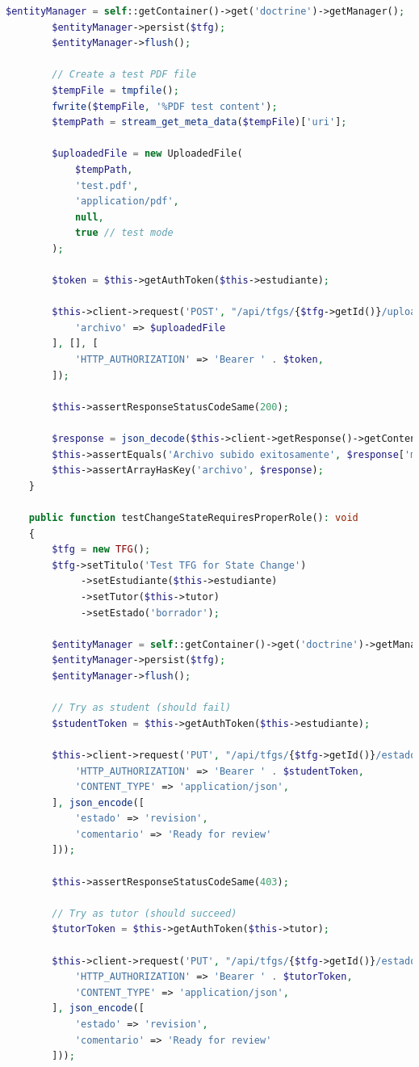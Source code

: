 \documentclass[12pt,a4paper,oneside]{report}
\begin{document}
\begin{lstlisting}[language=PHP]
        $entityManager = self::getContainer()->get('doctrine')->getManager();
        $entityManager->persist($tfg);
        $entityManager->flush();

        // Create a test PDF file
        $tempFile = tmpfile();
        fwrite($tempFile, '%PDF test content');
        $tempPath = stream_get_meta_data($tempFile)['uri'];

        $uploadedFile = new UploadedFile(
            $tempPath,
            'test.pdf',
            'application/pdf',
            null,
            true // test mode
        );

        $token = $this->getAuthToken($this->estudiante);

        $this->client->request('POST', "/api/tfgs/{$tfg->getId()}/upload", [
            'archivo' => $uploadedFile
        ], [], [
            'HTTP_AUTHORIZATION' => 'Bearer ' . $token,
        ]);

        $this->assertResponseStatusCodeSame(200);
        
        $response = json_decode($this->client->getResponse()->getContent(), true);
        $this->assertEquals('Archivo subido exitosamente', $response['message']);
        $this->assertArrayHasKey('archivo', $response);
    }

    public function testChangeStateRequiresProperRole(): void
    {
        $tfg = new TFG();
        $tfg->setTitulo('Test TFG for State Change')
             ->setEstudiante($this->estudiante)
             ->setTutor($this->tutor)
             ->setEstado('borrador');

        $entityManager = self::getContainer()->get('doctrine')->getManager();
        $entityManager->persist($tfg);
        $entityManager->flush();

        // Try as student (should fail)
        $studentToken = $this->getAuthToken($this->estudiante);
        
        $this->client->request('PUT', "/api/tfgs/{$tfg->getId()}/estado", [], [], [
            'HTTP_AUTHORIZATION' => 'Bearer ' . $studentToken,
            'CONTENT_TYPE' => 'application/json',
        ], json_encode([
            'estado' => 'revision',
            'comentario' => 'Ready for review'
        ]));

        $this->assertResponseStatusCodeSame(403);

        // Try as tutor (should succeed)
        $tutorToken = $this->getAuthToken($this->tutor);
        
        $this->client->request('PUT', "/api/tfgs/{$tfg->getId()}/estado", [], [], [
            'HTTP_AUTHORIZATION' => 'Bearer ' . $tutorToken,
            'CONTENT_TYPE' => 'application/json',
        ], json_encode([
            'estado' => 'revision',
            'comentario' => 'Ready for review'
        ]));


\end{lstlisting}
\end{document}
